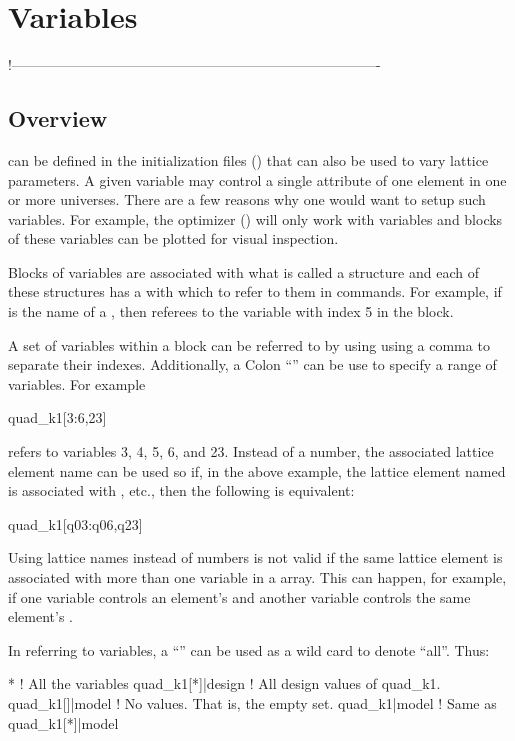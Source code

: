 \chapter{Variables}
\label{c:var}

!-------------------------------------------------------------------------------
\section{Overview}
\label{s:var.overview}

 can be defined in the \tao initialization files () that can also be
used to vary  lattice parameters.  A given \tao variable may control a single attribute of
one element in one or more universes.  There are a few reasons why one would want to setup such
variables.  For example, the optimizer () will only work with \tao variables and blocks
of these variables can be plotted for visual inspection.

Blocks of variables are associated with what is called a  structure and each of these
structures has a  with which to refer to them in \tao commands. For example, if
 is the name of a , then  referees to the variable with index
5 in the block.

A set of variables within a  block can be referred to by using using a comma \vn{,} to
separate their indexes. Additionally, a Colon ``\vn{:}'' can be use to specify a range of
variables. For example
\begin{example}
  quad_k1[3:6,23]
\end{example}
refers to variables 3, 4, 5, 6, and 23. Instead of a number, the associated lattice element name can
be used so if, in the above example, the lattice element named  is associated with
, etc., then the following is equivalent:
\begin{example}
  quad_k1[q03:q06,q23]
\end{example}
Using lattice names instead of numbers is not valid if the same lattice element is associated with
more than one variable in a  array. This can happen, for example, if one variable
controls an element's  and another variable controls the same element's .

In referring to variables, a ``\vn{*}'' can be used as a wild card to 
denote ``all''. Thus:
\begin{example}
  *                 ! All the variables
  quad_k1[*]|design ! All design values of quad_k1.
  quad_k1[]|model   ! No values. That is, the empty set.
  quad_k1|model     ! Same as quad_k1[*]|model
\end{example}

